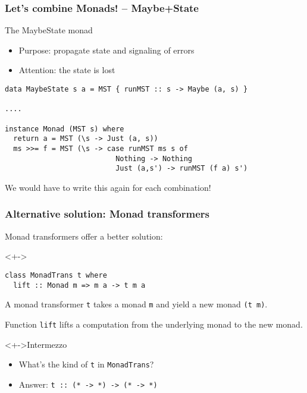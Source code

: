 \documentclass[pdftex,aspectratio=169]{beamer}
\begin{document}
\begin{frame}[fragile]
  \frametitle{Let's combine Monads! -- Maybe+State}
  \begin{block}{The MaybeState monad}
    \begin{itemize}
    \item Purpose: propagate state and signaling of errors
    \item Attention: the state is lost
    \end{itemize}
      \begin{lstlisting}
data MaybeState s a = MST { runMST :: s -> Maybe (a, s) }

....

instance Monad (MST s) where
  return a = MST (\s -> Just (a, s))
  ms >>= f = MST (\s -> case runMST ms s of
                          Nothing -> Nothing
                          Just (a,s') -> runMST (f a) s')
      \end{lstlisting}
    \end{block}
    \pause
    We would have to write this again for each combination!
\end{frame}

\begin{frame}[fragile]
  \frametitle{Alternative solution: Monad transformers}

  Monad transformers offer a better solution:
  \begin{block}<+->{}
\begin{lstlisting}
class MonadTrans t where
  lift :: Monad m => m a -> t m a
\end{lstlisting}

\end{block}

A monad transformer \lstinline{t} takes a monad \lstinline{m} and yield a new monad
\lstinline{(t m)}.

Function \lstinline{lift} lifts a computation from the underlying
monad to the new monad.

\begin{block}<+->{Intermezzo}
  \begin{itemize}[<+->]
  \item What's the kind of \lstinline{t} in \lstinline{MonadTrans}?
  \item Answer: \lstinline{t :: (* -> *) -> (* -> *)}
  \end{itemize}
\end{block}
\end{frame}
\end{document}
